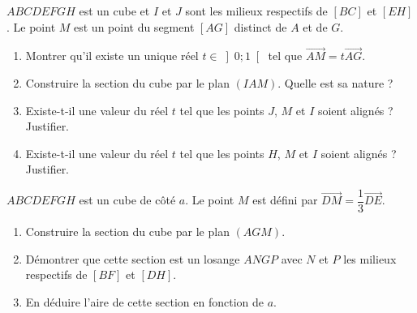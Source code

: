 \documentclass{cornouaille}
\begin{document}
  \begin{exercice}
    $ABCDEFGH$ est un cube et $I$ et $J$ sont les milieux respectifs de
    $[BC]$ et $[EH]$.  Le point $M$ est un point du segment $[AG]$
    distinct de $A$ et de $G$.
    \begin{enumerate}
    \item Montrer qu'il existe un unique réel $t\in\left] 0;1\right[ $
      tel que $\overrightarrow{AM}=t\overrightarrow{AG}$.
    \item Construire la section du cube par le plan $(IAM)$. Quelle
      est sa nature ?
    \item Existe-t-il une valeur du réel $t$ tel que les points $J$,
      $M$ et $I$ soient alignés ? Justifier.
    \item Existe-t-il une valeur du réel $t$ tel que les points $H$,
      $M$ et $I$ soient alignés ? Justifier.
    \end{enumerate}
  \end{exercice}

  \begin{exercice}
    $ABCDEFGH$ est un cube de côté $a$. Le point $M$ est défini par
    $\overrightarrow{DM}=\dfrac{1}{3}\overrightarrow{DE}$.
    \begin{enumerate}
    \item Construire la section du cube par le plan $(AGM)$.
    \item Démontrer que cette section est un losange $ANGP$ avec $N$
      et $P$ les milieux respectifs de $[BF]$ et $[DH]$.
    \item En déduire l'aire de cette section en fonction de $a$.
    \end{enumerate}
  \end{exercice}
\end{document}
